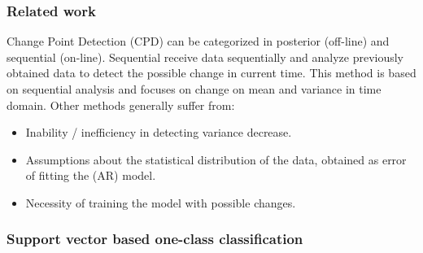 \subsubsection{Related work}
Change Point Detection (CPD) can be categorized in posterior (off-line) and sequential (on-line).
Sequential receive data sequentially and analyze previously obtained data to detect the possible change in current time.
This method is based on sequential analysis and focuses on change on mean and variance in time domain.
Other methods generally suffer from:
\begin{itemize}
  \item Inability / inefficiency in detecting variance decrease.
  \item Assumptions about the statistical distribution of the data, obtained as error of fitting the (AR) model.
  \item Necessity of training the model with possible changes.
\end{itemize}

\subsubsection{Support vector based one-class classification}
